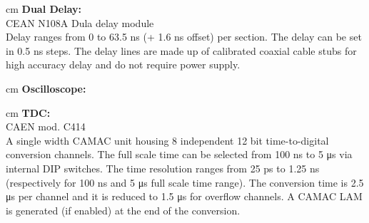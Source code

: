 	 cm
	\textbf{Dual Delay:} \\CEAN N108A Dula delay module\\
	Delay ranges from 0 to 63.5 ns (+ 1.6 ns offset) per section. The delay can be set in 0.5 ns steps. The delay lines are made up of calibrated coaxial cable stubs for high accuracy delay and do not require power supply.
	
	 cm
	\textbf{Oscilloscope:}
	
	 cm
	\textbf{TDC:} \\CAEN mod. C414\\
	A single width CAMAC unit housing 8 independent 12 bit time-to-digital conversion channels. The full scale time can be selected from 100 ns to 5 μs via internal DIP switches. The time resolution ranges from 25 ps to 1.25 ns (respectively for 100 ns and 5 μs full scale time range). The conversion time is 2.5 μs per channel and it is reduced to 1.5 μs for overflow channels. A CAMAC LAM is generated (if enabled) at the end of the conversion.
